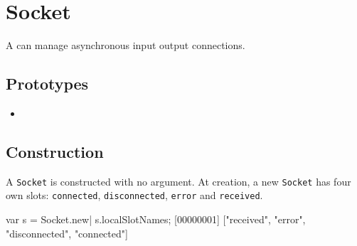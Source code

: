 \section{Socket}

A  can manage asynchronous input output connections.

\subsection{Prototypes}
\begin{itemize}
\item {}
\end{itemize}

\subsection{Construction}

A \lstinline|Socket| is constructed with no argument. At creation, a
new \lstinline|Socket| has four own slots: \lstinline|connected|,
\lstinline|disconnected|, \lstinline|error| and \lstinline|received|.

\begin{urbiscript}
var s = Socket.new|
s.localSlotNames;
[00000001] ["received", "error", "disconnected", "connected"]
\end{urbiscript}

